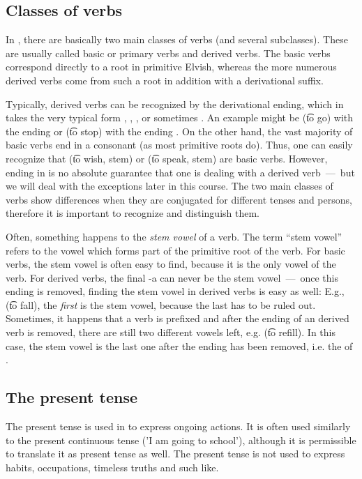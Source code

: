 \subsection{Classes of verbs}
In \quenya, there are basically two main classes of verbs (and several
subclasses). These are usually called basic or primary verbs and derived verbs.
The basic verbs correspond directly to a root in primitive Elvish, whereas the
more numerous derived verbs come from such a root in addition with a
derivational suffix.

Typically, derived verbs can be recognized by the derivational ending, which in
\quenya takes the very typical form , , ,  or
sometimes .
An example might be  (\t{to go}) with the ending  or
 (\t{to stop}) with the ending . On the other hand, the vast
majority of basic verbs end in a consonant (as most primitive roots do).
Thus, one can easily recognize that  (\t{to wish}, stem) or 
(\t{to speak}, stem) are basic verbs. However, ending in  is no absolute
guarantee that one is dealing with a derived verb~---~but we will deal with the
exceptions later in this course.
The two main classes of verbs show differences when they are conjugated for
different tenses and persons, therefore it is important to recognize and
distinguish them.

Often, something happens to the \emph{stem vowel} of a verb. The term ``stem
vowel'' refers to the vowel which forms part of the primitive root of the verb. For
basic verbs, the stem vowel is often easy to find, because it is the only vowel
of the verb. For derived verbs, the final -a can never be the stem
vowel~---~once this ending is removed, finding the stem vowel in derived verbs 
is easy as well:
E.g.,  (\t{to fall}), the \emph{first}  is the stem vowel,
because the last  has to be ruled out. Sometimes, it happens that a verb is prefixed
and after the ending of an derived verb is removed, there are still two different vowels left,
e.g.  (\t{to refill}). In this case, the stem vowel is the last one
after the ending has been removed, i.e. the  of .

\subsection{The present tense}
The present tense is used in \quenya to express ongoing actions. It is often
used similarly to the present continuous tense (’I am going to
school’), although it is permissible to translate it as present tense as well.
The \quenya present tense is not used to express habits, occupations, timeless
truths and such like.


